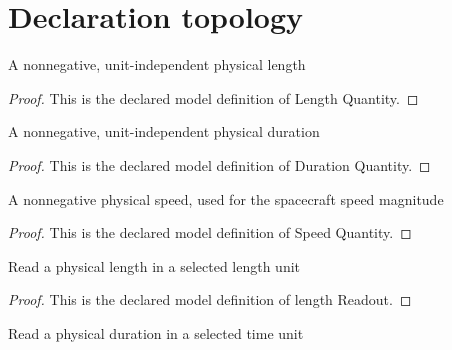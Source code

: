 \section{Declaration topology}
\begin{definition}
  \label{def:physics:phyx-mini-0528:phyxminiproblems-problemphyxmini0528-lengthquantity}
  A nonnegative, unit-independent physical length
\end{definition}
\begin{proof}
  This is the declared model definition of Length Quantity.
\end{proof}
\begin{definition}
  \label{def:physics:phyx-mini-0528:phyxminiproblems-problemphyxmini0528-durationquantity}
  A nonnegative, unit-independent physical duration
\end{definition}
\begin{proof}
  This is the declared model definition of Duration Quantity.
\end{proof}
\begin{definition}
  \label{def:physics:phyx-mini-0528:phyxminiproblems-problemphyxmini0528-speedquantity}
  A nonnegative physical speed, used for the spacecraft speed magnitude
\end{definition}
\begin{proof}
  This is the declared model definition of Speed Quantity.
\end{proof}
\begin{definition}
  \label{def:physics:phyx-mini-0528:phyxminiproblems-problemphyxmini0528-lengthreadout}
  Read a physical length in a selected length unit
\end{definition}
\begin{proof}
  This is the declared model definition of length Readout.
\end{proof}
\begin{definition}
  \label{def:physics:phyx-mini-0528:phyxminiproblems-problemphyxmini0528-durationreadout}
  Read a physical duration in a selected time unit
\end{definition}
